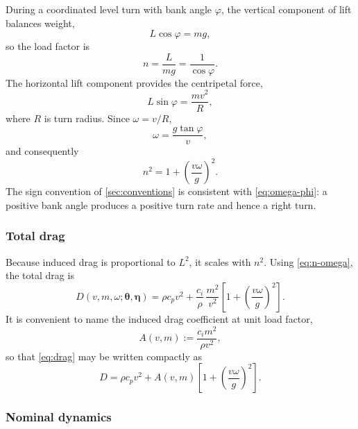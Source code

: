 \documentclass[11pt,a4paper]{article}
\newcommand{\vectheta}{\bm{\theta}}
\newcommand{\veceta}{\bm{\eta}}
\begin{document}
During a coordinated level turn with bank angle $\varphi$, the vertical
component of lift balances weight,
\begin{equation}
  L\cos\varphi = mg,
\end{equation}
so the load factor is
\begin{equation}
  n = \frac{L}{mg} = \frac{1}{\cos\varphi} .
  \label{eq:load-factor-def}
\end{equation}
The horizontal lift component provides the centripetal force,
\begin{equation}
  L\sin\varphi = \frac{mv^{2}}{R},
\end{equation}
where $R$ is turn radius. Since $\omega = v/R$,
\begin{equation}
  \omega = \frac{g\tan\varphi}{v},
  \label{eq:omega-phi}
\end{equation}
and consequently
\begin{equation}
  n^{2} = 1 + \left(\frac{v\omega}{g}\right)^{2} .
  \label{eq:n-omega}
\end{equation}
The sign convention of \cref{sec:conventions} is consistent with
\cref{eq:omega-phi}: a positive bank angle produces a positive turn rate and
hence a right turn.

\subsubsection{Total drag}

Because induced drag is proportional to $L^{2}$, it scales with $n^{2}$. Using
\cref{eq:n-omega}, the total drag is
\begin{equation}
  D(v, m, \omega; \vectheta, \veceta)
  = \rho c_p v^{2}
  + \frac{c_i}{\rho}\,\frac{m^{2}}{v^{2}}
    \left[ 1 + \left(\frac{v\omega}{g}\right)^{2} \right] .
  \label{eq:drag}
\end{equation}
It is convenient to name the induced drag coefficient at unit load factor,
\begin{equation}
  A(v,m) := \frac{c_i m^{2}}{\rho v^{2}},
  \label{eq:A}
\end{equation}
so that \cref{eq:drag} may be written compactly as
\begin{equation}
  D = \rho c_p v^{2} + A(v,m)\left[1 + \left(\frac{v\omega}{g}\right)^{2}\right].
  \label{eq:drag-compact}
\end{equation}

\subsubsection{Nominal dynamics}
\end{document}
